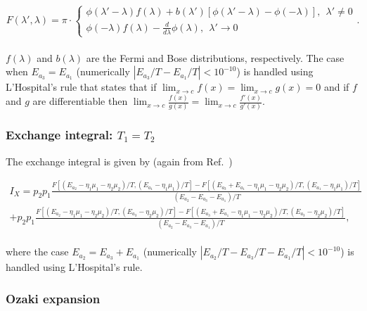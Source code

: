 \documentclass{article}
\begin{document}
\begin{equation}
    F(\lambda', \lambda) = \pi\cdot
    \begin{cases}
         \phi(\lambda'-\lambda)f(\lambda) + b(\lambda')[\phi(\lambda'-\lambda)-\phi(-\lambda)] , \ \ \lambda'\ne 0\\
         \phi(-\lambda)f(\lambda)-\frac{d}{d\lambda}\phi(\lambda) , \ \ \lambda'\rightarrow 0
    \end{cases} .
\end{equation}
\\
$f(\lambda)$ and $b(\lambda)$ are the Fermi and Bose distributions, respectively. The case when $E_{a_3}=E_{a_1}$ (numerically $|E_{a_3}/T-E_{a_1}/T|<10^{-10}$) is handled using L'Hospital's rule that states that if $\lim_{x\rightarrow c}f(x) = \lim_{x\rightarrow c}g(x) = 0$ and if $f$ and $g$ are differentiable then $\lim_{x\rightarrow c}\frac{f(x)}{g(x)} = \lim_{x\rightarrow c}\frac{f'(x)}{g'(x)}$.
\subsubsection{Exchange integral: $T_1=T_2$}

The exchange integral is given by (again from Ref.~\cite{leijnse2008kinetic})

\begin{equation}
\begin{split}
    I_X = p_2p_1\frac{F\left [ (E_{a_2}-\eta_1\mu_1-\eta_2\mu_2)/T , (E_{a_1}-\eta_1\mu_1)/T \right ] - F\left [ (E_{a_3} + E_{a_1}-\eta_1\mu_1-\eta_2\mu_2)/T , (E_{a_1}-\eta_1\mu_1)/T \right ]}{(E_{a_2}-E_{a_3}-E_{a_1})/T} \\
    + p_2p_1\frac{F\left [ (E_{a_2}-\eta_1\mu_1-\eta_2\mu_2)/T , (E_{a_3}-\eta_2\mu_2)/T \right ] - F\left [ (E_{a_3} + E_{a_1}-\eta_1\mu_1-\eta_2\mu_2)/T , (E_{a_3}-\eta_2\mu_2)/T \right ]}{(E_{a_2}-E_{a_3}-E_{a_1})/T},
\end{split}
\end{equation}
\\
where the case $E_{a_2} = E_{a_3} + E_{a_1}$ (numerically $|E_{a_2}/T - E_{a_3}/T - E_{a_1}/T|<10^{-10}$) is handled using L'Hospital's rule.
\subsubsection{Ozaki expansion}
\end{document}
